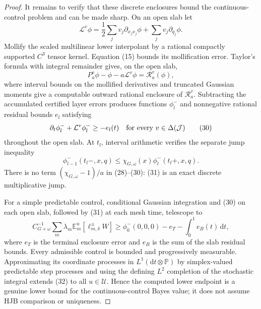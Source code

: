 \documentclass{article}
\begin{document}
\begin{proof}
It remains to verify that these discrete enclosures bound the continuous-control problem and can be made sharp.  On an open slab let
\[
 \mathcal L^v\phi=\frac12\sum_jv_j\partial_{x_jx_j}\phi+
 \sum_jv_j\partial_{q_j}\phi.
 \tag{28}
\]
Mollify the scaled multilinear lower interpolant by a rational compactly supported \(C^3\) tensor kernel.  Equation (15) bounds its mollification error.  Taylor's formula with integral remainder gives, on the open slab,
\[
 P_a^v\phi-\phi-a\mathcal L^v\phi=\mathcal R_a^v(\phi),
 \tag{29}
\]
where interval bounds on the mollified derivatives and truncated Gaussian moments give a computable outward rational enclosure of \(\mathcal R_a^v\).  Subtracting the accumulated certified layer errors produces functions \(\phi_l^-\) and nonnegative rational residual bounds \(e_l\) satisfying
\[
 \partial_t\phi_l^-+\mathcal L^v\phi_l^-\geq-e_l(t)
 \quad\hbox{for every }v\in\Delta(\mathcal J)
 \tag{30}
\]
throughout the open slab.  At \(t_l\), interval arithmetic verifies the separate jump inequality
\[
 \phi_{l-1}^-(t_l-,x,q)
 \leq\chi_{G,\omega}(x)\phi_l^-(t_l+,x,q).
 \tag{31}
\]
There is no term \((\chi_{G,\omega}-1)/a\) in (28)--(30): (31) is an exact discrete multiplicative jump.

For a simple predictable control, conditional Gaussian integration and (30) on each open slab, followed by (31) at each mesh time, telescope to
\[
 C_{G+\omega}^{-1}\sum_m\lambda_m
 \mathbb E_m^u[\ell_{m,\delta}^\pm W]
 \geq \phi_0^-(0,0,0)-e_T-\int_0^1e_B(t)\,\mathrm dt,
 \tag{32}
\]
where \(e_T\) is the terminal enclosure error and \(e_B\) is the sum of the slab residual bounds.  Every admissible control is bounded and progressively measurable.  Approximating its coordinate processes in \(L^1(\mathrm dt\otimes\mathbb P)\) by simplex-valued predictable step processes and using the defining \(L^2\) completion of the stochastic integral extends (32) to all \(u\in\mathcal U\).  Hence the computed lower endpoint is a genuine lower bound for the continuous-control Bayes value; it does not assume HJB comparison or uniqueness.


\end{proof}
\end{document}
